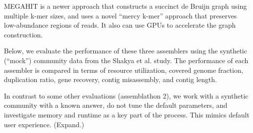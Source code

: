 \documentclass[10pt,a4paper,twocolumn]{article}
\begin{document}
MEGAHIT \cite{megahit} is a newer approach that constructs a succinct
de Bruijn graph using multiple k-mer sizes, and uses a novel ``mercy
k-mer'' approach that preserves low-abundance regions of reads. It also
can use GPUs to accelerate the graph construction.

Below, we evaluate the performance of these three assemblers using the
synthetic (``mock'') community data from the Shakya et al. study.
The performance of each assembler is compared in terms
of resource utilization, covered genome fraction, duplication ratio, gene
recovery, contig misassembly, and contig length.

In contrast to some other evaluations (assemblathon 2), we work with a
synthetic community with a known answer, do not tune the default
parameters, and investigate memory and runtime as a key part of the
process.  This mimics default user experience. (Expand.)





 
\end{document}
